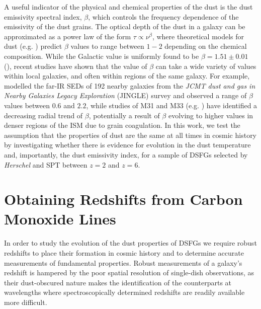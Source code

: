A useful indicator of the physical and chemical properties of the dust is the dust emissivity spectral index, $\beta$, which controls the frequency dependence of the emissivity of the dust grains. The optical depth of the dust in a galaxy can be approximated as a power law of the form $\tau \propto \nu^\beta$, where theoretical models for dust (e.g. \citealt{Draine_1984, Draine_2011, Kohler_2015}) predict $\beta$ values to range between $1 - 2$ depending on the chemical composition. While the Galactic value is uniformly found to be $\beta = 1.51\pm0.01$ (\citealt{Planck_Collaboration_2015}), recent studies have shown that the value of $\beta$ can take a wide variety of values within local galaxies, and often within regions of the same galaxy. For example, \citealt{Lamperti_2019} modelled the far-IR SEDs of 192 nearby galaxies from the \textit{JCMT dust and gas in Nearby Galaxies Legacy Exploration} (JINGLE) survey and observed a range of $\beta$ values between $0.6$ and $2.2$, while studies of M31 and M33 (e.g. \citealt{Smith_2012, Draine_2014, Tabatabaei_2014, Whitworth_2019, Athikkat-Eknath_2022, Clark_2023}) have identified a decreasing radial trend of $\beta$, potentially a result of $\beta$ evolving to higher values in denser regions of the ISM due to grain coagulation. In this work, we test the assumption that the properties of dust are the same at all times in cosmic history by investigating whether there is evidence for evolution in the dust temperature and, importantly, the dust emissivity index, for a sample of DSFGs selected by \textit{Herschel} and SPT between $z = 2$ and $z = 6$.

\section{Obtaining Redshifts from Carbon Monoxide Lines}

In order to study the evolution of the dust properties of DSFGs we require robust redshifts to place their formation in cosmic history and to determine accurate measurements of fundamental properties. Robust measurements of a galaxy's redshift is hampered by the poor spatial resolution of single-dish observations, as their dust-obscured nature makes the identification of the counterparts at wavelengths where spectroscopically determined redshifts are readily available more difficult.

